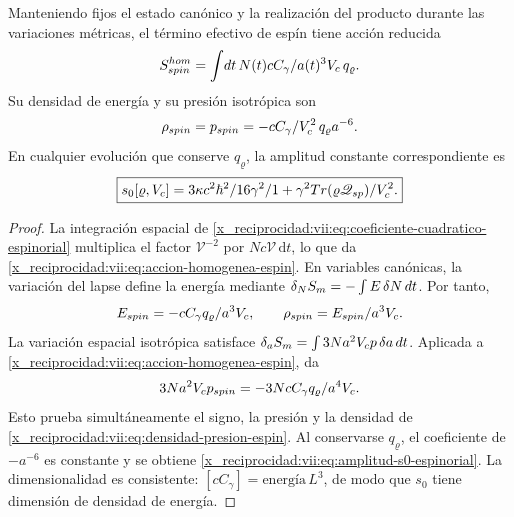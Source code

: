 \begin{theorem}
\label{x_reciprocidad:vii:thm:amplitud-material-explicita}
Manteniendo fijos el estado canónico y la realización del producto
durante las variaciones métricas, el término efectivo de espín tiene
acción reducida
\begin{equation}
 S_{\rm spin}^{\rm hom}
 =\int\!\mathrm dt\,N(t)
       \frac{cC_\gamma}{a(t)^3V_c}\,q_\varrho.
 \label{x_reciprocidad:vii:eq:accion-homogenea-espin}
\end{equation}
Su densidad de energía y su presión isotrópica son
\begin{equation}
 \rho_{\rm spin}=p_{\rm spin}
 =-\frac{cC_\gamma}{V_c^2}\,q_\varrho a^{-6}.
 \label{x_reciprocidad:vii:eq:densidad-presion-espin}
\end{equation}
En cualquier evolución que conserve \(q_\varrho\), la amplitud
constante correspondiente es
\begin{equation}
 \boxed{\displaystyle
 s_0[\varrho,V_c]
 =\frac{3\kappa c^2\hbar^2}{16}
    \frac{\gamma^2}{1+\gamma^2}
    \frac{\operatorname{Tr}
       (\varrho\widehat{\mathscr Q}_{\rm sp})}{V_c^2}.}
 \label{x_reciprocidad:vii:eq:amplitud-s0-espinorial}
\end{equation}
\end{theorem}
\begin{proof}
La integración espacial de
\eqref{x_reciprocidad:vii:eq:coeficiente-cuadratico-espinorial} multiplica el
factor \(\mathcal V^{-2}\) por
\(Nc\mathcal V\,\mathrm dt\), lo que da
\eqref{x_reciprocidad:vii:eq:accion-homogenea-espin}. En variables canónicas,
la variación del lapse define la energía mediante
\(\delta_N S_{\rm m}=-\int E\,\delta N\,\mathrm dt\).
Por tanto,
\[
 E_{\rm spin}=-\frac{cC_\gamma q_\varrho}{a^3V_c},
 \qquad \rho_{\rm spin}=\frac{E_{\rm spin}}{a^3V_c}.
\]
La variación espacial isotrópica satisface
\(\delta_a S_{\rm m}=\int3Na^2V_c p\,\delta a\,\mathrm dt\).
Aplicada a \eqref{x_reciprocidad:vii:eq:accion-homogenea-espin}, da
\[
 3Na^2V_c p_{\rm spin}
 =-\frac{3NcC_\gamma q_\varrho}{a^4V_c}.
\]
Esto prueba simultáneamente el signo, la presión y la densidad de
\eqref{x_reciprocidad:vii:eq:densidad-presion-espin}. Al conservarse
\(q_\varrho\), el coeficiente de \(-a^{-6}\) es constante y
se obtiene \eqref{x_reciprocidad:vii:eq:amplitud-s0-espinorial}. La dimensionalidad
es consistente: \([cC_\gamma]=\text{energía}\,L^3\),
de modo que \(s_0\) tiene dimensión de densidad de energía.
\end{proof}

